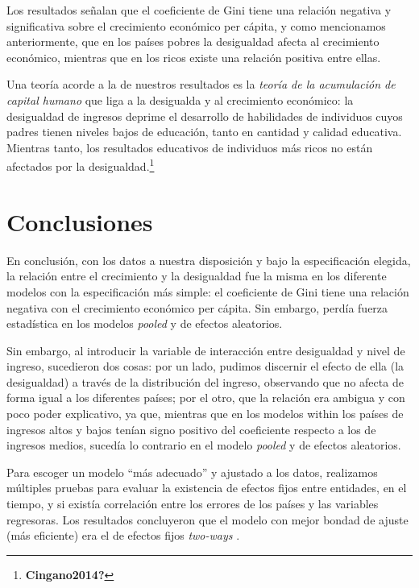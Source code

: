 \documentclass[
  11pt,
]{article}
\begin{document}
Los resultados señalan que el coeficiente de Gini tiene una relación
negativa y significativa sobre el crecimiento económico per cápita, y
como mencionamos anteriormente, que en los países pobres la desigualdad
afecta al crecimiento económico, mientras que en los ricos existe una
relación positiva entre ellas.

Una teoría acorde a la de nuestros resultados es la \emph{teoría de la
acumulación de capital humano} que liga a la desigualda y al crecimiento
económico: la desigualdad de ingresos deprime el desarrollo de
habilidades de individuos cuyos padres tienen niveles bajos de
educación, tanto en cantidad y calidad educativa. Mientras tanto, los
resultados educativos de individuos más ricos no están afectados por la
desigualdad.\footnote{\textbf{Cingano2014?}}

\hypertarget{conclusiones}{%
\section{Conclusiones}\label{conclusiones}}

En conclusión, con los datos a nuestra disposición y bajo la
especificación elegida, la relación entre el crecimiento y la
desigualdad fue la misma en los diferente modelos con la especificación
más simple: el coeficiente de Gini tiene una relación negativa con el
crecimiento económico per cápita. Sin embargo, perdía fuerza estadística
en los modelos \emph{pooled} y de efectos aleatorios.

Sin embargo, al introducir la variable de interacción entre desigualdad
y nivel de ingreso, sucedieron dos cosas: por un lado, pudimos discernir
el efecto de ella (la desigualdad) a través de la distribución del
ingreso, observando que no afecta de forma igual a los diferentes
países; por el otro, que la relación era ambigua y con poco poder
explicativo, ya que, mientras que en los modelos within los países de
ingresos altos y bajos tenían signo positivo del coeficiente respecto a
los de ingresos medios, sucedía lo contrario en el modelo \emph{pooled}
y de efectos aleatorios.

Para escoger un modelo ``más adecuado'' y ajustado a los datos,
realizamos múltiples pruebas para evaluar la existencia de efectos fijos
entre entidades, en el tiempo, y si existía correlación entre los
errores de los países y las variables regresoras. Los resultados
concluyeron que el modelo con mejor bondad de ajuste (más eficiente) era
el de efectos fijos \emph{two-ways} .
\end{document}
